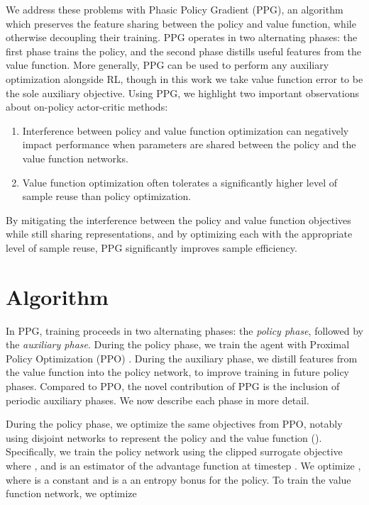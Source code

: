 \documentclass{article}
\begin{document}
We address these problems with Phasic Policy Gradient (PPG), an algorithm which preserves the feature sharing between the policy and value function, while otherwise decoupling their training. PPG operates in two alternating phases: the first phase trains the policy, and the second phase distills useful features from the value function. More generally, PPG can be used to perform any auxiliary optimization alongside RL, though in this work we take value function error to be the sole auxiliary objective. Using PPG, we highlight two important observations about on-policy actor-critic methods:

\begin{enumerate}
  \item Interference between policy and value function optimization can negatively impact performance when parameters are shared between the policy and the value function networks.
  \item Value function optimization often tolerates a significantly higher level of sample reuse than policy optimization.
\end{enumerate}

By mitigating the interference between the policy and value function objectives while still sharing representations, and by optimizing each with the appropriate level of sample reuse, PPG significantly improves sample efficiency.

\section{Algorithm} \label{sec:algorithm}

In PPG, training proceeds in two alternating phases: the \textit{policy phase}, followed by the \textit{auxiliary phase}. During the policy phase, we train the agent with Proximal Policy Optimization (PPO) \citep{ppo}. During the auxiliary phase, we distill features from the value function into the policy network, to improve training in future policy phases. Compared to PPO, the novel contribution of PPG is the inclusion of periodic auxiliary phases. We now describe each phase in more detail.

During the policy phase, we optimize the same objectives from PPO, notably using disjoint networks to represent the policy and the value function (). Specifically, we train the policy network using the clipped surrogate objective  where , and  is an estimator of the advantage function at timestep . We optimize , where  is a constant and  is a an entropy bonus for the policy. To train the value function network, we optimize
\end{document}
